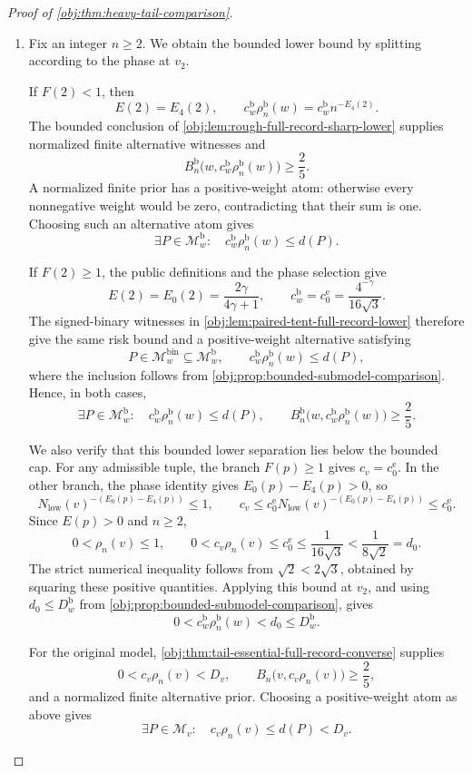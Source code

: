 \documentclass[11pt]{article}
\begin{document}
\begin{proof}[Proof of \cref{obj:thm:heavy-tail-comparison}]
\begin{enumerate}
\item Fix an integer \(n\ge2\). We obtain the bounded lower bound by splitting according to the phase at \(v_2\).

If \(F(2)<1\), then
\[
E(2)=E_4(2),
\qquad
c_w^{\mathrm b}\rho_n^{\mathrm b}(w)
=c_w^{\mathrm b}n^{-E_4(2)}.
\]
The bounded conclusion of \cref{obj:lem:rough-full-record-sharp-lower} supplies normalized finite alternative witnesses and
\[
B_n^{\mathrm b}
 \bigl(w,c_w^{\mathrm b}\rho_n^{\mathrm b}(w)\bigr)
\ge\frac25.
\]
A normalized finite prior has a positive-weight atom: otherwise every nonnegative weight would be zero, contradicting that their sum is one. Choosing such an alternative atom gives
\[
\exists P\in\mathcal M_w^{\mathrm b}:
\quad
c_w^{\mathrm b}\rho_n^{\mathrm b}(w)\le d(P).
\]

If \(F(2)\ge1\), the public definitions and the phase selection give
\[
E(2)=E_0(2)=\frac{2\gamma}{4\gamma+1},
\qquad
c_w^{\mathrm b}=c_0^{\mathrm e}
=\frac{4^{-\gamma}}{16\sqrt3}.
\]
The signed-binary witnesses in \cref{obj:lem:paired-tent-full-record-lower} therefore give the same risk bound and a positive-weight alternative satisfying
\[
P\in\mathcal M_w^{\mathrm{bin}}
\subseteq\mathcal M_w^{\mathrm b},
\qquad
c_w^{\mathrm b}\rho_n^{\mathrm b}(w)\le d(P),
\]
where the inclusion follows from \cref{obj:prop:bounded-submodel-comparison}. Hence, in both cases,
\[
\exists P\in\mathcal M_w^{\mathrm b}:
\quad c_w^{\mathrm b}\rho_n^{\mathrm b}(w)\le d(P),
\qquad
B_n^{\mathrm b}
 \bigl(w,c_w^{\mathrm b}\rho_n^{\mathrm b}(w)\bigr)
\ge\frac25.
\]

We also verify that this bounded lower separation lies below the bounded cap. For any admissible tuple, the branch \(F(p)\ge1\) gives \(c_v=c_0^{\mathrm e}\). In the other branch, the phase identity gives \(E_0(p)-E_4(p)>0\), so
\[
N_{\mathrm{low}}(v)^{-(E_0(p)-E_4(p))}\le1,
\qquad
c_v\le
c_0^{\mathrm e}N_{\mathrm{low}}(v)^{-(E_0(p)-E_4(p))}
\le c_0^{\mathrm e}.
\]
Since \(E(p)>0\) and \(n\ge2\),
\[
0<\rho_n(v)\le1,
\qquad
0<c_v\rho_n(v)\le c_0^{\mathrm e}
\le\frac1{16\sqrt3}
<\frac1{8\sqrt2}=d_0.
\]
The strict numerical inequality follows from
\(\sqrt2<2\sqrt3\), obtained by squaring these positive quantities. Applying this bound at \(v_2\), and using
\(d_0\le D_w^{\mathrm b}\) from \cref{obj:prop:bounded-submodel-comparison}, gives
\[
0<c_w^{\mathrm b}\rho_n^{\mathrm b}(w)
<d_0\le D_w^{\mathrm b}.
\]

For the original model, \cref{obj:thm:tail-essential-full-record-converse} supplies
\[
0<c_v\rho_n(v)<D_v,
\qquad
B_n\bigl(v,c_v\rho_n(v)\bigr)\ge\frac25,
\]
and a normalized finite alternative prior. Choosing a positive-weight atom as above gives
\[
\exists P\in\mathcal M_v:
\quad c_v\rho_n(v)\le d(P)<D_v.
\]


\end{enumerate}
\end{proof}
\end{document}
